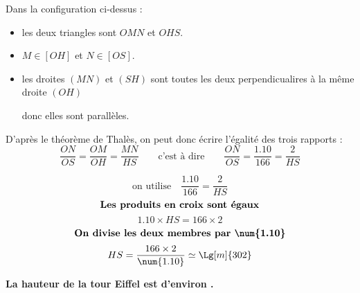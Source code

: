     \medskip
    {\color{red}
    Dans la configuration ci-dessus :
    \begin{itemize}
        \item les deux triangles sont $OMN$ et $OHS$.
        \item $M \in [OH]$ et $N \in [OS]$.
        \item les droites $(MN)$ et $(SH)$ sont toutes les deux perpendicualires à la même droite $(OH)$

        donc elles sont parallèles.
    \end{itemize}
    D'après le théorème de Thalès, on peut donc écrire l'égalité des trois rapports :
    $$\frac{ON}{OS}=\frac{OM}{OH}=\frac{MN}{HS}\qquad\mbox{c'est à dire}\qquad\frac{ON}{OS}=\frac{\num{1.10}}{166}=\frac{2}{HS}$$

        $$\mbox{on utilise} \quad \dfrac{\num{1.10}}{166}=\dfrac{2}{HS}$$
        $$\mbox{\bf Les produits en croix sont égaux}$$
        $$\num{1.10}\times HS=166\times 2$$
        $$\mbox{\bf On divise les deux membres par \num{1.10}}$$
        $$HS=\frac{166\times 2}{\num{1.10}}\simeq\Lg[m]{302}$$

        \textbf{La hauteur de la tour Eiffel est d'environ .}
    }
